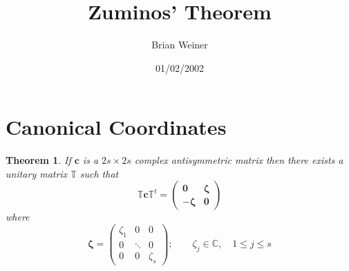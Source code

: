 \documentclass[aps,preprint]{revtex4}
\newtheorem{theorem}{Theorem}
\begin{document}
\title[Zuminos' Theorem]{Zuminos' Theorem}
\author{Brian Weiner}
\date{01/02/2002}
\maketitle
\tableofcontents

\section{ Canonical Coordinates}

\begin{theorem}
If $\mathbf{c}$ is a $2s\times 2s$ complex antisymmetric matrix then there
exists a unitary matrix $\mathbb{T}$ such that 
\begin{equation}
\mathbb{T}\mathbf{c}\mathbb{T}^{t}=\left( 
\begin{array}{cc}
\mathbf{0} & \mathbf{\zeta } \\ 
-\mathbf{\zeta } & \mathbf{0}%
\end{array}%
\right) 
\end{equation}%
where 
\begin{equation}
\mathbf{\zeta }=\left( 
\begin{array}{ccc}
\zeta _{1} & 0 & 0 \\ 
0 & \ddots  & 0 \\ 
0 & 0 & \zeta _{s}%
\end{array}%
\right) ;\qquad \zeta _{j}\in \mathbb{C},\quad 1\leq j\leq s
\end{equation}


\end{theorem}
\end{document}
